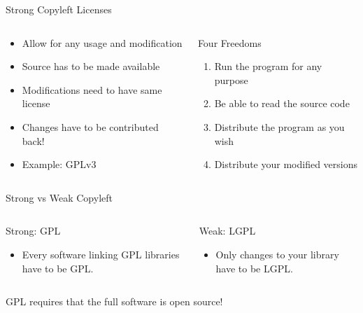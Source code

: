 \documentclass[compress,aspectratio=169]{beamer}
\begin{document}
  \begin{frame}{Strong Copyleft Licenses}
    \begin{columns}
      \begin{column}{0.5\textwidth}
        \begin{itemize}
          \item Allow for any usage and modification
          \item Source has to be made available
          \item Modifications need to have same license
          \item Changes have to be contributed back!
          \item Example: GPLv3
        \end{itemize}
      \end{column}
      \begin{column}{0.5\textwidth}
        \begin{block}{Four Freedoms \cite{freedoms}}
          \begin{enumerate}
            \item Run the program for any purpose
            \item Be able to read the source code
            \item Distribute the program as you wish
            \item Distribute your modified versions
          \end{enumerate}
        \end{block}
      \end{column}
    \end{columns}
  \end{frame}

  \begin{frame}{Strong vs Weak Copyleft}
    \begin{columns}
      \begin{column}{0.5\textwidth}
        \begin{block}{Strong: GPL}
          \begin{itemize}
            \item Every software linking GPL libraries have to be GPL.
          \end{itemize}
        \end{block}
      \end{column}
      \begin{column}{0.5\textwidth}
        \begin{block}{Weak: LGPL}
          \begin{itemize}
            \item Only changes to your library have to be LGPL.
          \end{itemize}
        \end{block}
      \end{column}
    \end{columns}
    {
      \begin{center}
        \Large GPL requires that the full software is open source!
      \end{center}
    }
  \end{frame}
\end{document}
